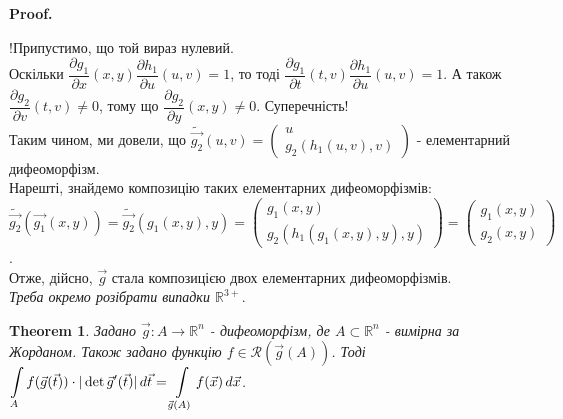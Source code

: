 \documentclass[a4paper, 10pt]{article}
\makeatletter
\def\departial#1#2{\dfrac{\partial {#1}}{\partial {#2}}}
\def\huge{\displaystyle}
\def\qed{$\blacksquare$}
\theoremstyle{theoremdd}
\newtheorem{theorem}{Theorem}[subsection]
\theoremstyle{theoremdd}
\theoremstyle{theoremdd}
\theoremstyle{theoremdd}
\theoremstyle{theoremdd}
\theoremstyle{theoremdd}
\theoremstyle{theoremdd}
\theoremstyle{theoremdd}
\renewenvironment{proof}[1][Proof.\\]{\par
\pushQED{\hfill \qed}%
\normalfont \topsep6\p@\@plus6\p@\relax
\trivlist
\item\relax
{\bfseries
#1\@addpunct{.}}\hspace\labelsep\ignorespaces
}{%
\popQED\endtrivlist\@endpefalse
}
\makeatother
\begin{document}
\begin{proof}
!Припустимо, що той вираз нулевий.\\
Оскільки $\departial{g_1}{x}(x,y) \departial{h_1}{u}(u,v) = 1$, то тоді $\departial{g_1}{t}(t,v) \departial{h_1}{u}(u,v) = 1$. А також $\departial{g_2}{v}(t,v) \neq 0$, тому що $\departial{g_2}{y}(x,y) \neq 0$. Суперечність!\\
Таким чином, ми довели, що $\tilde{\vec{g_2}}(u,v) = \begin{pmatrix}
u \\ g_2(h_1(u,v),v)
\end{pmatrix}$ - елементарний дифеоморфізм.\\
Нарешті, знайдемо композицію таких елементарних дифеоморфізмів:\\
$\tilde{\vec{g_2}}(\vec{g_1}(x,y)) = \tilde{\vec{g_2}}(g_1(x,y),y) = \begin{pmatrix}
g_1(x,y) \\
g_2(h_1(g_1(x,y),y),y)
\end{pmatrix} = \begin{pmatrix}
g_1(x,y) \\ g_2(x,y)
\end{pmatrix}$.\\
Отже, дійсно, $\vec{g}$ стала композицією двох елементарних дифеоморфізмів.
\bigskip \\
\textit{Треба окремо розібрати випадки $\mathbb{R}^{3+}$}.
\end{proof}
\fi

\begin{theorem}
Задано $\vec{g}: A \to \mathbb{R}^n$ - дифеоморфізм, де $A \subset \mathbb{R}^n$ - вимірна за Жорданом. Також задано функцію $f \in \mathcal{R}(\vec{g}(A))$. Тоді\\
$\huge\int\displaylimits_A f(\vec{g}(\vec{t})) \cdot |\det \vec{g}'(\vec{t})| \,d\vec{t} = \int\displaylimits_{\vec{g}(A)} f(\vec{x}) \,d\vec{x}$.
\end{theorem}
\end{document}
